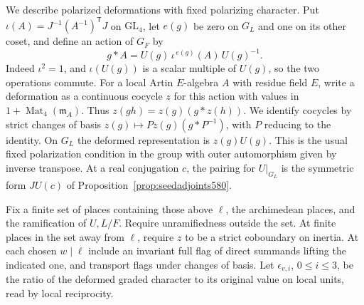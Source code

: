 \documentclass[a4paper,11pt]{article}
\theoremstyle{definition}
\theoremstyle{remark}
\numberwithin{equation}{section}
\begin{document}
We describe polarized deformations with fixed polarizing
character. Put \(\iota(A)=J^{-1}(A^{-1})^{\mathsf T}J\) on
\(\mathrm{GL}_4\), let \(e(g)\) be zero on \(G_L\) and one on its
other coset, and define an action of \(G_F\) by
\[
             g*A=U(g)\,\iota^{\,e(g)}(A)\,U(g)^{-1}.
\]
Indeed \(\iota^2=1\), and \(\iota(U(g))\) is a scalar
multiple of \(U(g)\), so the two operations commute.
For a local Artin \(E\)-algebra \(A\) with residue field \(E\),
write a deformation as a continuous cocycle \(z\) for this
action with values in \(1+\operatorname{Mat}_4(\mathfrak m_A)\).
Thus \(z(gh)=z(g)(g*z(h))\). We identify cocycles by strict
changes of basis \(z(g)\mapsto Pz(g)(g*P^{-1})\), with
\(P\) reducing to the identity. On \(G_L\) the deformed
representation is \(z(g)U(g)\). This is the usual fixed
polarization condition in the group with outer automorphism
given by inverse transpose. At a real conjugation \(c\), the
pairing for \(U|_{G_L}\) is the symmetric form \(JU(c)\) of
Proposition~\ref{prop:seedadjoints580}.

Fix a finite set of places containing those above \(\ell\),
the archimedean places, and the ramification of \(U,L/F\).
Require unramifiedness outside the set. At finite places
in the set away from \(\ell\), require \(z\) to be a strict
coboundary on inertia. At each chosen \(w\mid\ell\) include
an invariant full flag of direct summands lifting the indicated
one, and transport flags under changes of basis. Let
\(\epsilon_{v,i}\), \(0\le i\le3\), be the ratio of the
deformed graded character to its original value on local
units, read by local reciprocity.
\end{document}
